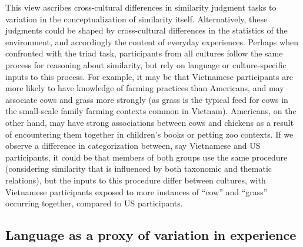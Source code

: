 \documentclass[10pt, letterpaper]{article}
\begin{document}
This view ascribes cross-cultural differences in similarity judgment
tasks to variation in the conceptualization of similarity itself.
Alternatively, these judgments could be shaped by cross-cultural
differences in the statistics of the environment, and accordingly the
content of everyday experiences. Perhaps when confronted with the triad
task, participants from all cultures follow the same process for
reasoning about similarity, but rely on language or culture-specific
inputs to this process. For example, it may be that Vietnamese
participants are more likely to have knowledge of farming practices than
Americans, and may associate cows and grass more strongly (as grass is
the typical feed for cows in the small-scale family farming contexts
common in Vietnam). Americans, on the other hand, may have strong
associations between cows and chickens as a result of encountering them
together in children's books or petting zoo contexts. If we observe a
difference in categorization between, say Vietnamese and US
participants, it could be that members of both groups use the same
procedure (considering similarity that is influenced by both taxonomic
and thematic relations), but the inputs to this procedure differ between
cultures, with Vietnamese participants exposed to more instances of
``cow'' and ``grass'' occurring together, compared to US participants.

\hypertarget{language-as-a-proxy-of-variation-in-experience}{%
\subsection{Language as a proxy of variation in
experience}\label{language-as-a-proxy-of-variation-in-experience}}
\end{document}
